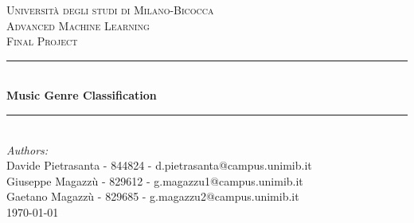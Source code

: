 \begin{titlepage}

    \newcommand{\HRule}{\rule{\linewidth}{0.5mm}} %

    \center %


    \textsc{\LARGE Università degli studi di Milano-Bicocca}\\[1cm] %
    \textsc{\Large Advanced Machine Learning }\\[0.3cm] %
    \textsc{\large Final Project}\\[0.1cm] %


    \HRule \\[0.4cm]
    { \huge \bfseries Music Genre Classification}\\[0.4cm] %
    \HRule \\[1.5cm]


    \large
    \emph{Authors:}\\
    Davide Pietrasanta - 844824 - d.pietrasanta@campus.unimib.it  \\   %
    Giuseppe Magazzù - 829612 - g.magazzu1@campus.unimib.it   \\ %
    Gaetano Magazzù - 829685 - g.magazzu2@campus.unimib.it   \\[0.4cm] %


    {\large \today}\\[2cm] %


\end{titlepage}
